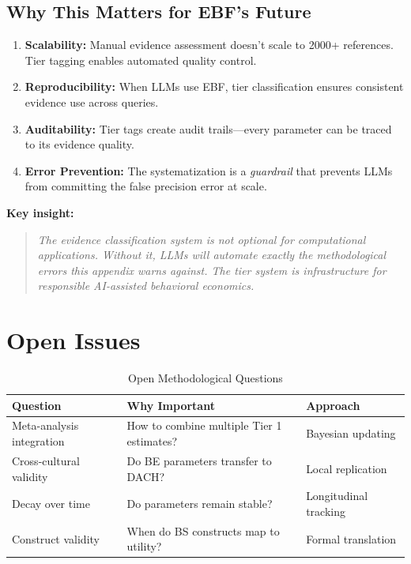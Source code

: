 \documentclass[11pt, a4paper]{article}
\begin{document}
\subsection{Why This Matters for EBF's Future}

\begin{enumerate}
\item \textbf{Scalability:} Manual evidence assessment doesn't scale to 2000+ references. Tier tagging enables automated quality control.

\item \textbf{Reproducibility:} When LLMs use EBF, tier classification ensures consistent evidence use across queries.

\item \textbf{Auditability:} Tier tags create audit trails---every parameter can be traced to its evidence quality.

\item \textbf{Error Prevention:} The systematization is a \textit{guardrail} that prevents LLMs from committing the false precision error at scale.
\end{enumerate}

\textbf{Key insight:}
\begin{quote}
\textit{The evidence classification system is not optional for computational applications. Without it, LLMs will automate exactly the methodological errors this appendix warns against. The tier system is infrastructure for responsible AI-assisted behavioral economics.}
\end{quote}


\section{Open Issues}
\label{sec:evd-open}

\begin{table}[htbp]
\centering
\caption{Open Methodological Questions}
\label{tab:evd-open}
\renewcommand{\arraystretch}{1.3}
\begin{tabular}{@{}p{4cm}p{5cm}p{3cm}@{}}
\toprule
\textbf{Question} & \textbf{Why Important} & \textbf{Approach} \\
\midrule
Meta-analysis integration & How to combine multiple Tier 1 estimates? & Bayesian updating \\
Cross-cultural validity & Do BE parameters transfer to DACH? & Local replication \\
Decay over time & Do parameters remain stable? & Longitudinal tracking \\
Construct validity & When do BS constructs map to utility? & Formal translation \\
\bottomrule
\end{tabular}
\end{table}
\end{document}
